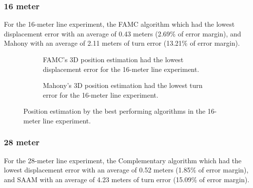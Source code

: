 \subsubsection{16 meter}

For the 16-meter line experiment, the FAMC algorithm which had the lowest displacement error with an average of 0.43 meters (2.69\% of error margin), and Mahony with an average of 2.11 meters of turn error (13.21\% of error margin).

\begin{figure}[!h]
    \centering
    
\end{figure}

\begin{figure}[!h]
    \centering
    \begin{subfigure}{0.49\textwidth}
        \centering
        \resizebox{1\linewidth}{!}{}
        \caption{ FAMC's 3D position estimation had the lowest displacement error for the 16-meter line experiment. }
        \label{fig:line16_2D}
    \end{subfigure}
    \begin{subfigure}{0.49\textwidth}
        \centering
        \resizebox{1\linewidth}{!}{}
        \caption{Mahony's 3D position estimation had the lowest turn error for the 16-meter line experiment.}
        \label{fig:line16_3D}
    \end{subfigure}
    \caption{Position estimation by the best performing algorithms in the 16-meter line experiment.}
    \label{fig:line16}
\end{figure}

\subsubsection{28 meter}

For the 28-meter line experiment, the Complementary algorithm which had the lowest displacement error with an average of 0.52 meters (1.85\% of error margin), and SAAM with an average of 4.23 meters of turn error (15.09\% of error margin).

\begin{figure}[!h]
    \centering
    
\end{figure}

